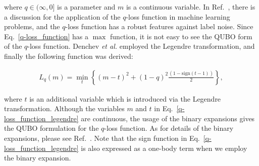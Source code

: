 \documentclass[fp,twocolumn]{jpsj3}
\begin{document}
\noindent
where $q \in (\infty,0]$ is a parameter and $m$ is a continuous variable. 
In Ref.~, there is a discussion for the application of the $q$-loss function in machine learning problems, and the $q$-loss function has a robust features against label noise.
Since Eq.~\ref{q-loss_function} has a $\max$ function, it is not easy to see the QUBO form of the $q$-loss function.
Denchev \textit{et al.} employed the Legendre transformation,
and finally the following function was derived\cite{q-loss}:

\begin{eqnarray}
  L_{q}(m)=\min_{t}{\left\{(m-t)^{2}+(1-q)^{2}\frac{(1-\text{sign}(t-1))}{2}\right\}}, \label{q-loss_function_legendre}
\end{eqnarray}

where $t$ is an additional variable which is introduced via the Legendre transformation.
Although the variables $m$ and $t$ in Eq.~\eqref{q-loss_function_legendre} are continuous, the usage of the binary expansions gives the QUBO formulation for the $q$-loss function.
As for details of the binary expansions, please see Ref.~.
Note that the sign function in Eq.~\eqref{q-loss_function_legendre} is also expressed as a one-body term when we employ the binary expansion.


\end{document}
